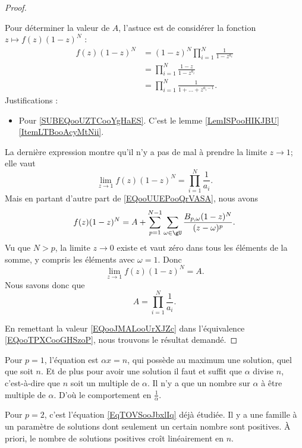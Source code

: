 \begin{proof}
\begin{subproof}
		\spitem[La valeur de \( A\)]
		Pour déterminer la valeur de \( A\), l'astuce est de considérer la fonction \( z\mapsto f(z)(1-z)^N\) :
		\begin{subequations}
			\begin{align}
				f(z)(1-z)^N & =(1-z)^N\prod_{i=1}^N\frac{1}{ 1-z^{a_i} }                                      \\
				            & =\prod_{i=1}^N\frac{ 1-z }{ 1-z^{a_i} }                                         \\
				            & =\prod_{i=1}^N\frac{1}{ 1+\ldots +z^{a_i-1} }.      \label{SUBEQooUZTCooYgHaES}
			\end{align}
		\end{subequations}
		Justifications :
		\begin{itemize}
			\item Pour \eqref{SUBEQooUZTCooYgHaES}. C'est le lemme \ref{LemISPooHIKJBU}\ref{ItemLTBooAcyMtNii}.
		\end{itemize}
		La dernière expression montre qu'il n'y a pas de mal à prendre la limite \( z\to 1\); elle vaut
		\begin{equation}
			\lim_{z\to 1} f(z)(1-z)^N=\prod_{i=1}^N\frac{1}{ a_i }.
		\end{equation}
		Mais en partant d'autre part de \eqref{EQooUUEPooQrVASA}, nous avons
		\begin{equation}
			f(z)(1-z)^N=A+\sum_{p=1}^{N-1}\sum_{\omega\in \gU}\frac{ B_{p,\omega}(1-z)^N }{ (z-\omega)^p }.
		\end{equation}
		Vu que \( N>p\), la limite \( z\to 0\) existe et vaut zéro dans tous les éléments de la somme, y compris les éléments avec \( \omega=1\). Donc
		\begin{equation}
			\lim_{z\to 1}f(z)(1-z)^N=A.
		\end{equation}
		Nous savons donc que
		\begin{equation}        \label{EQooJMALooUrXJZc}
			A=\prod_{i=1}^N\frac{1}{ a_i }.
		\end{equation}
	\end{subproof}
	En remettant la valeur \eqref{EQooJMALooUrXJZc} dans l'équivalence \eqref{EQooTPXCooGHSzoP}, nous trouvons le résultat demandé.
\end{proof}

\begin{example}
	Pour \( p=1\), l'équation est \( \alpha x=n\), qui possède au maximum une solution, quel que soit \( n\). Et de plus pour avoir une solution il faut et suffit que \( \alpha\) divise \( n\), c'est-à-dire que \( n\) soit un multiple de \( \alpha\). Il n'y a que un nombre sur \( \alpha\) à être multiple de \( \alpha\). D'où le comportement en \( \frac{1}{ \alpha }\).

	Pour \( p=2\), c'est l'équation \eqref{EqTOVSooJbxlIq} déjà étudiée. Il y a une famille à un paramètre de solutions dont seulement un certain nombre sont positives. À priori, le nombre de solutions positives croît linéairement en \( n\).
\end{example}


